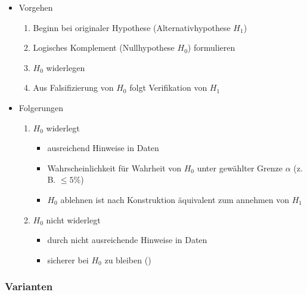 \documentclass[nonacm=true, language=german]{acmart}
\begin{document}
\begin{itemize}
    \item Vorgehen
    \begin{enumerate}
        \item Beginn bei originaler Hypothese (Alternativhypothese $H_1$)
        \item Logisches Komplement (Nullhypothese $H_0$) formulieren
        \item $H_0$ widerlegen
        \item Aus Falsifizierung von $H_0$ folgt Verifikation von $H_1$
    \end{enumerate}
    \item Folgerungen
    \begin{enumerate}
        \item $H_0$ widerlegt
        \begin{itemize}
            \item ausreichend Hinweise in Daten
            \item Wahrscheinlichkeit für Wahrheit von $H_0$ unter gewählter Grenze $\alpha$ (z. B. $\leq 5\%$)
            \item $H_0$ ablehnen ist nach Konstruktion äquivalent zum annehmen von $H_1$
        \end{itemize}
        \item $H_0$ nicht widerlegt
        \begin{itemize}
            \item durch nicht ausreichende Hinweise in Daten
            \item sicherer bei $H_0$ zu bleiben ()
        \end{itemize}
    \end{enumerate}
\end{itemize}

\subsubsection{Varianten}
\end{document}
